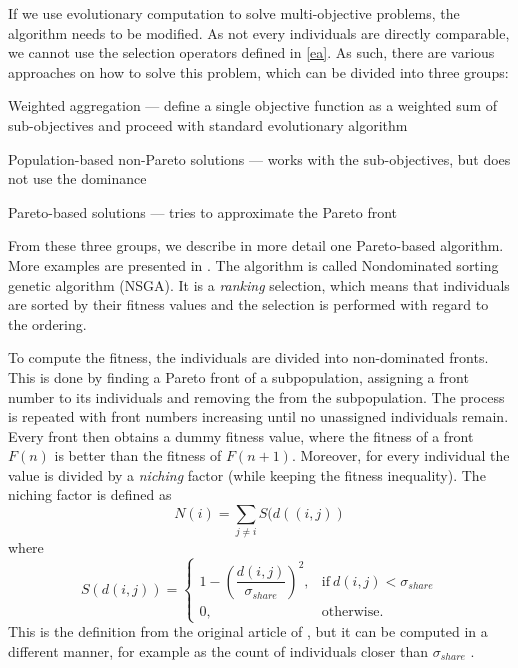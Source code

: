 If we use evolutionary computation to solve multi-objective problems, the
algorithm needs to be modified. As not every individuals are directly
comparable, we cannot use the selection operators defined in
\ref{ea}. As such, there are various approaches on how to solve this problem,
which can be divided into three groups:

\begin{compactitem}
\item Weighted aggregation --- define a single objective function as a weighted
sum of sub-objectives and proceed with standard evolutionary algorithm
\item Population-based non-Pareto solutions --- works with the sub-objectives,
but does not use the dominance
\item Pareto-based solutions --- tries to approximate the Pareto front
\end{compactitem}

From these three groups, we describe in more detail one Pareto-based algorithm.
More examples are presented in 
\cite[p.~170-173]{Engelbrecht:2007:CII:1557464}.
The algorithm is called Nondominated sorting genetic algorithm (NSGA). It is a
\emph{ranking} selection, which means that individuals are sorted by their
fitness values and the selection is performed with regard to the ordering.

To compute the fitness, the individuals are divided into non-dominated fronts.
This is done by finding a Pareto front of a subpopulation, assigning a
front number to its individuals and removing the from the subpopulation.
The process is repeated with front numbers increasing until no unassigned
individuals remain. Every front then obtains a dummy fitness value, where
the fitness of a front $F(n)$ is better than the fitness of $F(n+1)$. Moreover,
for every individual the value is divided by a \emph{niching} factor (while
keeping the fitness inequality). The 
niching factor is defined as
$$N(i)=\sum_{j\neq i}{S(d((i,j))}$$ where 
\begin{equation}
    S(d(i,j))=
    \begin{cases}
      1 - (\dfrac{d(i,j)}{\sigma_{share}})^2, & \text{if}\ d(i,j) < \sigma_{share} \\
      0, & \text{otherwise.}
    \end{cases}
\end{equation}
This is the definition from the original article of
\cite{Srinivas:1994:MOU:1326668.1326671}, but it can be computed in a different
manner, for example as the count of individuals closer than $\sigma_{share}$
\citep{Engelbrecht:2007:CII:1557464}.

